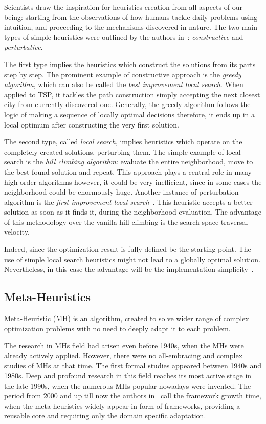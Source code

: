 Scientists draw the inspiration for heuristics creation from all aspects of our being: starting from the observations of how humans tackle daily problems using intuition, and proceeding to the mechanisms discovered in nature. The two main types of simple heuristics were outlined by the authors in~\cite{burke2019classification}: \textit{constructive} and \textit{perturbative}. 

The first type implies the heuristics which construct the solutions from its parts step by step. 
The prominent example of constructive approach is the \textit{greedy algorithm}, which can also be called the \textit{best improvement local search}. When applied to TSP, it tackles the path construction simply accepting the next closest city from currently discovered one. Generally, the greedy algorithm follows the logic of making a sequence of locally optimal decisions therefore, it ends up in a local optimum after constructing the very first solution. 

The second type, called \textit{local search}, implies heuristics which operate on the completely created solutions, perturbing them. The simple example of local search is the \textit{hill climbing algorithm}: evaluate the entire neighborhood, move to the best found solution and repeat. This approach plays a central role in many high-order algorithms however, it could be very inefficient, since in some cases the neighborhood could be enormously huge. 
Another instance of perturbation algorithm is the \textit{first improvement local search}~\cite{voudouris1999guided}. This heuristic accepts a better solution as soon as it finds it, during the neighborhood evaluation. The advantage of this methodology over the vanilla hill climbing is the search space traversal velocity.

Indeed, since the optimization result is fully defined be the starting point. The use of simple local search heuristics might not lead to a globally optimal solution. Nevertheless, in this case the advantage will be the implementation simplicity~\cite{williamson2011design}.

 
\subsection{Meta-Heuristics}
Meta-Heuristic (MH) is an algorithm, created to solve wider range of complex optimization problems with no need to deeply adapt it to each problem.

The research in MHs field had arisen even before 1940s, when the MHs were already actively applied. However, there were no all-embracing and complex studies of MHs at that time. The first formal studies appeared between 1940s and 1980s. Deep and profound research in this field reaches its most active stage in the late 1990s, when the numerous MHs popular nowadays were invented. The period from 2000 and up till now the authors in~\cite{sorensen2017history} call the framework growth time, when the meta-heuristics widely appear in form of frameworks, providing a reusable core and requiring only the domain specific adaptation.

